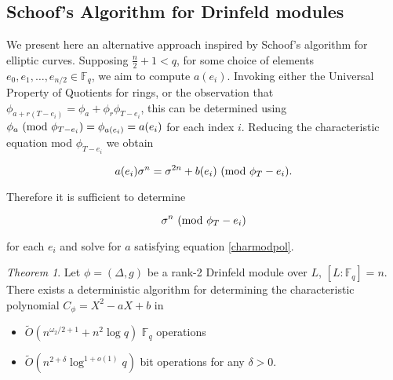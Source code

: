 \documentclass{jams-l}
\theoremstyle{remark}
\numberwithin{equation}{section}
\newtheorem{theorem}{Theorem}
\begin{document}
\subsection{Schoof's Algorithm for Drinfeld modules}

We present here an alternative approach inspired by Schoof's algorithm for elliptic curves. Supposing $ \frac{n}{2} + 1 < q$, for some choice of elements $e_0, e_1, \ldots, e_{n/2} \in \mathbb{F}_q$, we aim to compute $a(e_i)$. Invoking either the Universal Property of Quotients for rings, or the observation that $\phi_{a + r(T-e_i)} = \phi_a + \phi_{r} \phi_{T- e_i}$, this can be determined using $\phi_a \textnormal{ (mod } \phi_{T - e_i} \textnormal{)} = \phi_{a(e_i)} = a(e_i)$ for each index $i$. Reducing the characteristic equation mod $\phi_{T- e_i}$ we obtain

\begin{equation}\label{charmodpol}
 a(e_i) \sigma^n  = \sigma^{2n} + b(e_i) \textnormal{ (mod } \phi_{T} - e_i \textnormal{)}.
 \end{equation}

\noindent Therefore it is sufficient to determine

\[\sigma^{n} \textnormal{ (mod } \phi_{T} - e_i \textnormal{)} \]

\noindent for each $e_i$ and solve for $a$ satisfying equation \ref{charmodpol}. 

\begin{theorem}

Let $\phi = (\Delta, g)$ be a rank-2 Drinfeld module over $L$, $[L: \mathbb{F}_q] = n$. There exists a deterministic algorithm for determining the characteristic polynomial $C_{\phi} = X^2 -aX + b$ in
\begin{itemize}
\item $\widetilde{O}(n^{\omega_2/2 + 1} + n^2 \log q)$ $\mathbb{F}_q$ operations

\item $\widetilde{O}(n^{2+\delta} \log^{1 + o(1)} q)$ bit operations for any $\delta > 0$.
\end{itemize}

\end{theorem}
\end{document}
